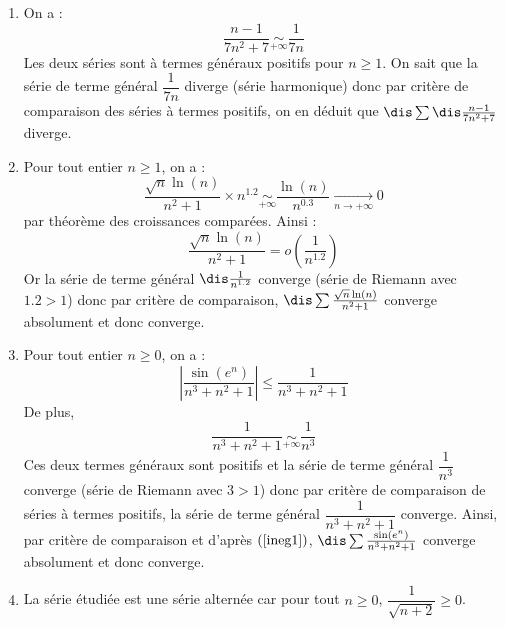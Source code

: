\documentclass[a4paper,10pt]{report}
\begin{document}
\corr \begin{enumerate}
\item On a :
$$ \frac{n-1}{7n^2+7} \underset{+ \infty}{\sim} \frac{1}{7n}$$
Les deux séries sont à termes généraux positifs pour $n \geq 1$. On sait que la série de terme général $\dfrac{1}{7n}$ diverge (série harmonique) donc par critère de comparaison des séries à termes positifs, on en déduit que $\dis\sum \dis\frac{n-1}{7n^2+7}$ diverge.
\item Pour tout entier $n \geq 1$, on a :
$$ \frac{\sqrt{n}\ln(n)}{n^2+1} \times n^{1.2} \underset{+ \infty}{\sim}  \frac{\ln(n)}{n^{0.3}} \underset{n \rightarrow + \infty}{\longrightarrow} 0$$
par théorème des croissances comparées. Ainsi :
$$ \frac{\sqrt{n}\ln(n)}{n^2+1} = o \left( \frac{1}{n^{1.2}} \right)$$
Or la série de terme général $\dis \frac{1}{n^{1.2}}$ converge (série de Riemann avec $1.2 >1$) donc par critère de comparaison, $\dis\sum\frac{\sqrt{n}\ln(n)}{n^2+1}$ converge absolument et donc converge.
\item Pour tout entier $n \geq 0$, on a :
\begin{equation}\label{ineg1}
\left\vert \frac{\sin(e^n)}{n^3+n^2+1} \right\vert \leq \frac{1}{n^3+n^2+1}
\end{equation}
De plus,
$$ \frac{1}{n^3+n^2+1} \underset{+ \infty}{\sim} \frac{1}{n^3}$$
Ces deux termes généraux sont positifs et la série de terme général $\dfrac{1}{n^3}$ converge (série de Riemann avec $3>1$) donc par critère de comparaison de séries à termes positifs, la série de terme général $\dfrac{1}{n^3+n^2+1}$ converge. Ainsi, par critère de comparaison et d'après $(\ref{ineg1})$, $\dis \sum \frac{\sin(e^n)}{n^3+n^2+1}$ converge absolument et donc converge.
\item La série étudiée est une série alternée car pour tout $n \geq 0$, $\dfrac{1}{\sqrt{n+2}} \geq 0$.



\end{enumerate}
\end{document}
